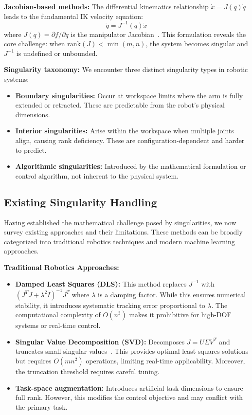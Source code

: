 \documentclass[twoside,11pt]{article}
\begin{document}
\textbf{Jacobian-based methods:} The differential kinematics relationship $\dot{x} = J(q)\dot{q}$ leads to the fundamental IK velocity equation:
$$\dot{q} = J^{-1}(q)\dot{x}$$
where $J(q) = \partial f/\partial q$ is the manipulator Jacobian~\citep{nakamura1991advanced}. This formulation reveals the core challenge: when $\mathrm{rank}(J) < \min(m,n)$, the system becomes singular and $J^{-1}$ is undefined or unbounded.

\textbf{Singularity taxonomy:} We encounter three distinct singularity types in robotic systems:
\begin{itemize}
\item \textbf{Boundary singularities:} Occur at workspace limits where the arm is fully extended or retracted. These are predictable from the robot's physical dimensions.
\item \textbf{Interior singularities:} Arise within the workspace when multiple joints align, causing rank deficiency. These are configuration-dependent and harder to predict.
\item \textbf{Algorithmic singularities:} Introduced by the mathematical formulation or control algorithm, not inherent to the physical system.
\end{itemize}
\subsection{Existing Singularity Handling}
Having established the mathematical challenge posed by singularities, we now survey existing approaches and their limitations. These methods can be broadly categorized into traditional robotics techniques and modern machine learning approaches.

\textbf{Traditional Robotics Approaches:}
\begin{itemize}
\item \textbf{Damped Least Squares (DLS):} This method replaces $J^{-1}$ with $(J^TJ + \lambda^2I)^{-1}J^T$ where $\lambda$ is a damping factor. While this ensures numerical stability, it introduces systematic tracking error proportional to $\lambda$. The computational complexity of $O(n^3)$ makes it prohibitive for high-DOF systems or real-time control.
\item \textbf{Singular Value Decomposition (SVD):} Decomposes $J = U\Sigma V^T$ and truncates small singular values~\citep{golub2013matrix}. This provides optimal least-squares solutions but requires $O(mn^2)$ operations, limiting real-time applicability. Moreover, the truncation threshold requires careful tuning.
\item \textbf{Task-space augmentation:} Introduces artificial task dimensions to ensure full rank. However, this modifies the control objective and may conflict with the primary task.
\end{itemize}
\end{document}

